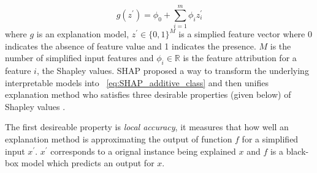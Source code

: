 \documentclass[english]{tktltiki2}
\theoremstyle{definition}
\theoremstyle{remark}
\begin{document}
\begin{equation}\label{eq:SHAP_additive_class}
	g(z^\prime) =  \phi_0 + \sum_{i=1}^{m} \phi_i z_i^\prime 
\end{equation}
where $g$ is an explanation model, $z^\prime \in \{0,1\}^{M}$ is a simplied feature vector where 0 indicates the absence of feature value and 1 indicates the presence. $M$ is the number of simplified input features and $\phi_i \in \mathbb{R}$ is the feature attribution for a feature $i$, the Shapley values. SHAP proposed a way to transform the underlying interpretable models into ~\eqref{eq:SHAP_additive_class} and then unifies explanation method who satisfies three desirable properties (given below) of Shapley values \citep{molnarinterpretable}.

The first desireable property is \textit{local accuracy}, it measures that how well an explanation method is approximating the output of function $f$ for a simplified input $x^\prime$. $x^\prime$ corresponds to a orignal instance being explained $x$ and $f$ is a black-box model which predicts an output for $x$.
\end{document}
